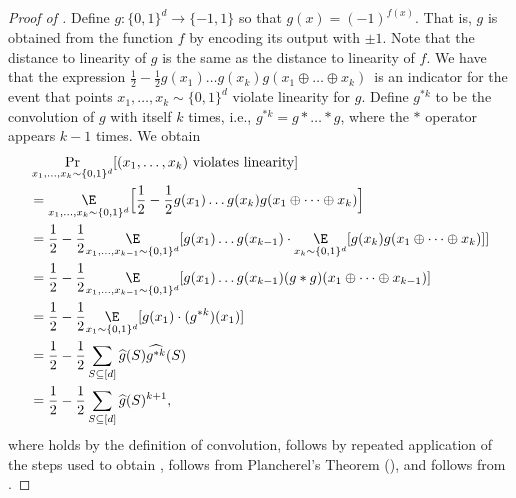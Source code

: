 \documentclass[11pt]{article}
\numberwithin{equation}{section}
\theoremstyle{definition}
\theoremstyle{plain}
\begin{document}
\begin{proof}[Proof of ]
    Define $g \colon \{0,1\}^d \to \{-1, 1\}$ so that $g(x) = (-1)^{f(x)}$.
   That is, $g$ is obtained from the function $f$ by encoding its output with $\pm 1$.  Note that the distance to linearity of $g$ is the same as the distance to linearity of $f$. 
   We have that the expression $\frac{1}{2} - \frac{1}{2}g(x_1)\dots g(x_k)g(x_1 \oplus \dots \oplus x_k)$~is an indicator for the event that 
   points $x_1, \dots, x_k\sim \{0,1\}^d$ violate linearity 
   for $g$. Define $g^{*k}$ to be the convolution of $g$ with itself $k$ times, i.e., $g^{*k} = g * \dots * g$, where the $*$ operator appears $k-1$ times.  We obtain
  \begin{align}
      &\Pr_{x_1, \dots, x_k \sim \{0,1\}^d}[(x_1, \dots, x_k) \textnormal{ violates linearity}]\nonumber \\
      &= \underset{x_1, \dots, x_k \sim \{0,1\}^d}{\E} \Big[\frac{1}{2} - \frac{1}{2}g(x_1)\dots g(x_k)g(x_1 \oplus \dots \oplus x_k)\Big] \nonumber \\
      &= \frac{1}{2} - \frac{1}{2} \underset{x_1 , \dots, x_{k-1} \sim \{0,1\}^d}{\E} [g(x_1) \dots g(x_{k-1}) \cdot \underset{x_k \sim \{0,1\}^d}{\E} [g(x_k) g(x_1 \oplus \dots \oplus x_k)]]
      \nonumber  \\
      &= \frac{1}{2} - \frac{1}{2} \underset{x_1 , \dots, x_{k-1} \sim \{0,1\}^d}{\E} [g(x_1) \dots g(x_{k-1}) (g * g)(x_1\oplus \dots \oplus x_{k-1})]
      \label{eq:definition} \\
      &= \frac{1}{2} - \frac{1}{2} \underset{x_1 \sim \{0,1\}^d}{\E} [g(x_1) \cdot (g^{*k})(x_1)]  \label{eq:repeat} \\
      &=  \frac{1}{2} - \frac{1}{2}\sum_{S \subseteq [d]} \widehat{g}(S) \widehat{g^{*k}}(S) \label{eq:plancherel}\\ 
      &=  \frac{1}{2} - \frac{1}{2} \sum_{S \subseteq [d]} \widehat{g}(S)^{k+1}, \label{eq:convolution}
  \end{align}
  where   holds by the definition of convolution,  follows by repeated application of the steps used to obtain ,   follows from Plancherel’s Theorem (), and   follows from .
  

\end{proof}
\end{document}

